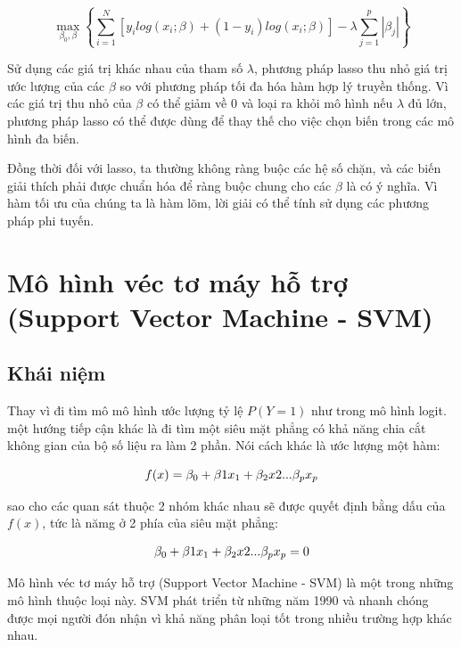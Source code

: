 \documentclass[a4paper]{report}\usepackage[]{graphicx}\usepackage[]{color}
\begin{document}
{\large
$$
\max_{\beta_0, \beta} \left \{ \sum_{i = 1}^N [ y_i log (x_i ; \beta) + (1- y_i)log (x_i; \beta)] - \lambda \sum_{j = 1}^p|\beta_j|\right \}
$$
}

Sử dụng các giá trị khác nhau của tham số $\lambda$, phương pháp lasso thu nhỏ giá trị ước lượng của các $\beta$ so với phương pháp tối đa hóa hàm hợp lý truyền thống. Vì các giá trị thu nhỏ của $\beta$ có thể giảm về 0 và loại ra khỏi mô hình nếu $\lambda$ đủ lớn, phương pháp lasso có thể được dùng để thay thế cho việc chọn biến trong các mô hình đa biến.

Đồng thời đối với lasso, ta thường không ràng buộc các hệ số chặn, và các biến giải thích phải được chuẩn hóa để ràng buộc chung cho các $\beta$ là có ý nghĩa. Vì hàm tối ưu của chúng ta là hàm lõm, lời giải có thể tính sử dụng các phương pháp phi tuyến. %

\section{Mô hình véc tơ máy hỗ trợ (Support Vector Machine - SVM)}

\subsection{Khái niệm}
Thay vì đi tìm mô mô hình ước lượng tỷ lệ $P(Y =1)$ như trong mô hình logit. một hướng tiếp cận khác là đi tìm một siêu mặt phẳng có khả năng chia cắt không gian của bộ số liệu ra làm 2 phần. Nói cách khác là ước lượng một hàm:

$$
\large
f(x) = \beta_0 + \beta1 x_1 + \beta_2 x2 ...\beta_p x_p
$$

sao cho các quan sát thuộc 2 nhóm khác nhau sẽ được quyết định bằng dấu của $f(x)$, tức là nămg ở 2 phía của siêu mặt phẳng:

$$
\large
\beta_0 + \beta1 x_1 + \beta_2 x2 ...\beta_p x_p = 0
$$

Mô hình véc tơ máy hỗ trợ (Support Vector Machine - SVM) là một trong những mô hình thuộc loại này. SVM phát triển từ những năm 1990 và nhanh chóng được mọi người đón nhận vì khả năng phân loại tốt trong nhiều trường hợp khác nhau.
\end{document}

